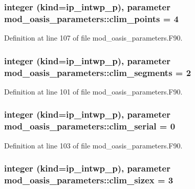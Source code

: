 \hypertarget{classmod__oasis__parameters_aa9d90a3d7d5b21d2081a578dfea42fd4}{
\subsubsection[{clim\+\_\+points}]{\setlength{\rightskip}{0pt plus 5cm}integer (kind=ip\+\_\+intwp\+\_\+p), parameter mod\+\_\+oasis\+\_\+parameters\+::clim\+\_\+points = 4}}\label{classmod__oasis__parameters_aa9d90a3d7d5b21d2081a578dfea42fd4}


Definition at line 107 of file mod\+\_\+oasis\+\_\+parameters.\+F90.

\hypertarget{classmod__oasis__parameters_a7427036a6530871a0f49c0fb75f2b3ef}{
\subsubsection[{clim\+\_\+segments}]{\setlength{\rightskip}{0pt plus 5cm}integer (kind=ip\+\_\+intwp\+\_\+p), parameter mod\+\_\+oasis\+\_\+parameters\+::clim\+\_\+segments = 2}}\label{classmod__oasis__parameters_a7427036a6530871a0f49c0fb75f2b3ef}


Definition at line 101 of file mod\+\_\+oasis\+\_\+parameters.\+F90.

\hypertarget{classmod__oasis__parameters_a5c410369e763f9156d0ce1c82e866265}{
\subsubsection[{clim\+\_\+serial}]{\setlength{\rightskip}{0pt plus 5cm}integer (kind=ip\+\_\+intwp\+\_\+p), parameter mod\+\_\+oasis\+\_\+parameters\+::clim\+\_\+serial = 0}}\label{classmod__oasis__parameters_a5c410369e763f9156d0ce1c82e866265}


Definition at line 103 of file mod\+\_\+oasis\+\_\+parameters.\+F90.

\hypertarget{classmod__oasis__parameters_a4fb35a666ab4cec927a2ae9244535cb0}{
\subsubsection[{clim\+\_\+sizex}]{\setlength{\rightskip}{0pt plus 5cm}integer (kind=ip\+\_\+intwp\+\_\+p), parameter mod\+\_\+oasis\+\_\+parameters\+::clim\+\_\+sizex = 3}}\label{classmod__oasis__parameters_a4fb35a666ab4cec927a2ae9244535cb0}


